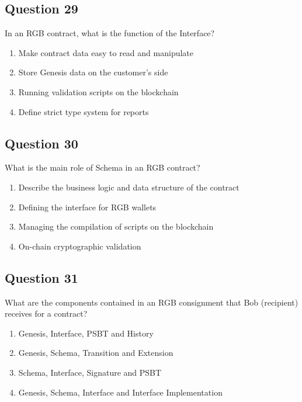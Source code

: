 \documentclass[12pt,a4paper]{article}
\begin{document}
\bigskip


\subsection*{Question 29}
In an RGB contract, what is the function of the Interface?

\begin{enumerate}[label=\Alph*., leftmargin=*]
\item Make contract data easy to read and manipulate
\item Store Genesis data on the customer's side
\item Running validation scripts on the blockchain
\item Define strict type system for reports
\end{enumerate}

\bigskip


\subsection*{Question 30}
What is the main role of Schema in an RGB contract?

\begin{enumerate}[label=\Alph*., leftmargin=*]
\item Describe the business logic and data structure of the contract
\item Defining the interface for RGB wallets
\item Managing the compilation of scripts on the blockchain
\item On-chain cryptographic validation
\end{enumerate}

\bigskip


\subsection*{Question 31}
What are the components contained in an RGB consignment that Bob (recipient) receives for a contract?

\begin{enumerate}[label=\Alph*., leftmargin=*]
\item Genesis, Interface, PSBT and History
\item Genesis, Schema, Transition and Extension
\item Schema, Interface, Signature and PSBT
\item Genesis, Schema, Interface and Interface Implementation
\end{enumerate}
\end{document}
